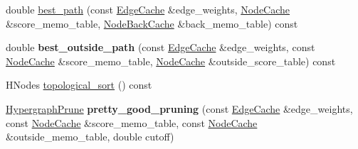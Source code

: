\begin{DoxyCompactItemize}
\item 
double \hyperlink{class_scarab_1_1_h_g_1_1_hypergraph_algorithms_aa9a28bf42d17a166ec5e780067e33259}{best\_\-path} (const \hyperlink{class_cache}{EdgeCache} \&edge\_\-weights, \hyperlink{class_cache}{NodeCache} \&score\_\-memo\_\-table, \hyperlink{class_cache}{NodeBackCache} \&back\_\-memo\_\-table) const 
\item 
\hypertarget{class_scarab_1_1_h_g_1_1_hypergraph_algorithms_a8eea2c8f3cd86a08962b46d1a4c57a20}{
double {\bfseries best\_\-outside\_\-path} (const \hyperlink{class_cache}{EdgeCache} \&edge\_\-weights, const \hyperlink{class_cache}{NodeCache} \&score\_\-memo\_\-table, \hyperlink{class_cache}{NodeCache} \&outside\_\-score\_\-table) const }
\label{class_scarab_1_1_h_g_1_1_hypergraph_algorithms_a8eea2c8f3cd86a08962b46d1a4c57a20}

\item 
HNodes \hyperlink{class_scarab_1_1_h_g_1_1_hypergraph_algorithms_afeb33bac104955747948b3d4a885cdc4}{topological\_\-sort} () const 
\item 
\hypertarget{class_scarab_1_1_h_g_1_1_hypergraph_algorithms_a3b26656f35480c12e79f4040dce7bae1}{
\hyperlink{struct_scarab_1_1_h_g_1_1_hypergraph_prune}{HypergraphPrune} {\bfseries pretty\_\-good\_\-pruning} (const \hyperlink{class_cache}{EdgeCache} \&edge\_\-weights, const \hyperlink{class_cache}{NodeCache} \&score\_\-memo\_\-table, const \hyperlink{class_cache}{NodeCache} \&outside\_\-memo\_\-table, double cutoff)}
\label{class_scarab_1_1_h_g_1_1_hypergraph_algorithms_a3b26656f35480c12e79f4040dce7bae1}

\end{DoxyCompactItemize}


